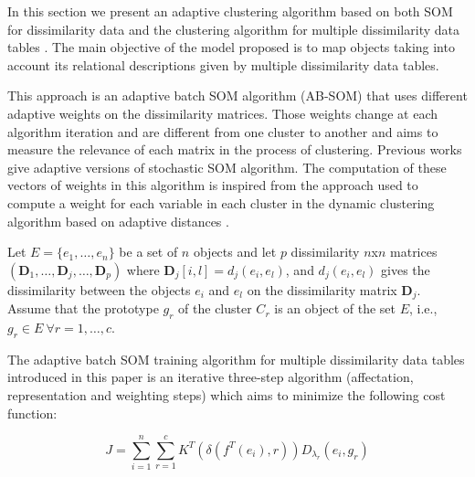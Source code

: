 \documentclass[10pt, conference, compsocconf]{IEEEtran}
\begin{document}
In this section we present an adaptive clustering algorithm based on both SOM for dissimilarity data \cite{golli:2004} and the clustering algorithm for multiple dissimilarity data tables \cite{DeCarvalho:2011}. The main objective of the model proposed is to map objects taking into account its relational descriptions given by multiple dissimilarity data tables.

This approach is an adaptive batch SOM algorithm (AB-SOM) that uses different adaptive weights on the dissimilarity matrices. Those weights change at each algorithm iteration and are different from one cluster to another and aims to measure the relevance of each matrix in the process of clustering. Previous works \cite{Kangas:1990}  \cite{Grozavu:2009} give adaptive versions of stochastic SOM algorithm. The computation of these vectors of weights in this algorithm is inspired from the approach used to compute a weight for each variable in each cluster in the dynamic clustering algorithm based on adaptive distances \cite{Diday:1977}.

Let $E = \{e_1,\dots,e_n\}$ be a set of $n$ objects	and let $p$ dissimilarity $n$x$n$ matrices $(\textbf{D}_1, \dots, \textbf{D}_j, \dots, \textbf{D}_p)$ where $\textbf{D}_j[i,l] = d_j(e_i,e_l)$, and $d_j(e_i,e_l)$ gives the dissimilarity between the objects $e_i$ and $e_l$ on the dissimilarity matrix $\textbf{D}_j$. Assume that the prototype $g_r$ of the cluster $C_r$ is an object of the set $E$, i.e., $g_r \in E \: \forall r = 1,\dots, c$.

The adaptive batch SOM training algorithm for multiple dissimilarity data tables introduced in this paper is an iterative three-step algorithm (affectation, representation and weighting steps) which aims to minimize the following cost function:

\begin{equation}
J = \sum_{i=1}^n \sum_{r=1}^c K^T (\delta(f^T(e_i),r)) D_{\lambda_{r}}(e_i, g_r)
\label{cost_func_adaptive}
\end{equation}


\end{document}
